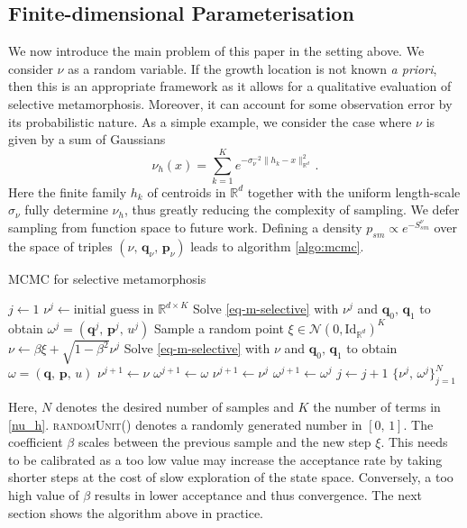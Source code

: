 \documentclass[runningheads]{llncs}
\newcommand{\Rd}{\mathbb{R}^{d}}
\newcommand{\RdK}{\mathbb{R}^{d\times K}}
\begin{document}
\subsection{Finite-dimensional Parameterisation}\label{subs:finite-dim-param}

We now introduce the main problem of this paper in the setting above. We
consider $\nu$ as a random variable. If the growth location is not known \emph{a
priori}, then this is an appropriate framework as it allows for a qualitative
evaluation of selective metamorphosis. Moreover, it can account for some
observation error by its probabilistic nature. As a simple example, we consider
the case where $\nu$ is given by a sum of Gaussians 
\begin{equation}\label{nu_h}
    \nu_h (x) = \sum_{k=1}^K e^{ -\sigma_\nu^{-2}\|h_k - x\|_{\Rd}^2}\, . 
\end{equation}
Here the finite family $h_k$ of centroids in $\Rd$ together with the uniform
length-scale $\sigma_\nu$ fully determine $\nu_h$, thus greatly reducing the
complexity of sampling. We defer sampling from function space to future work.
Defining a density $p_{sm} \propto e^{- S_{sm}^\nu}$ over the space of triples
$(\nu,\,\mathbf q_\nu,\,\mathbf p_\nu)$ leads to algorithm \ref{algo:mcmc}.
\begin{algorithm}[h!]
\begin{algorithmic}
\caption{MCMC for selective metamorphosis}\label{algo:mcmc}
\Procedure{mcmcSM}{$N$, $K$, $\mathbf q_0$, $\mathbf q_1$, $\beta\in (0,1]$}
\State $j \gets 1$
\State $\nu^j \gets \text{initial guess in } \RdK$
\State Solve \eqref{eq-m-selective} with $\nu^j$ and $\mathbf q_0,\,\mathbf q_1$
to obtain $\omega^j = (\mathbf q^j,\,\mathbf p^j,\, u^j)$
\State Sample a random point $\xi \in \mathcal N(0, \text{Id}_{\mathbb R^d})^K$
\State $\nu \gets \beta \xi + \sqrt{1-\beta^2} \nu^j$
\State Solve \eqref{eq-m-selective} with $\nu$ and $\mathbf q_0,\,\mathbf q_1$
to obtain $\omega = (\mathbf q,\, \mathbf p,\, u)$
    \State $\nu^{j+1} \gets \nu$
    \State $\omega^{j+1} \gets \omega$
\Else
    \State $\nu^{j+1} \gets \nu^j$
    \State $\omega^{j+1} \gets \omega^j$
\EndIf
\State $j\gets j+1$
\EndWhile
\Return $\{\nu^j,\, \omega^j\}_{j=1}^N$
\EndProcedure
\end{algorithmic}
\end{algorithm}


Here, $N$ denotes the desired number
of samples and $K$ the number of terms in \eqref{nu_h}. \textsc{randomUnit()}
denotes a randomly generated number in $[0,\,1]$. The coefficient $\beta$ scales
between the previous sample and the new step $\xi$. This needs to be calibrated
as a too low value may increase the acceptance rate by taking shorter steps at
the cost of slow exploration of the state space. Conversely, a too high value of
$\beta$ results in lower acceptance and thus convergence. The next section shows
the algorithm above in practice.
\end{document}

